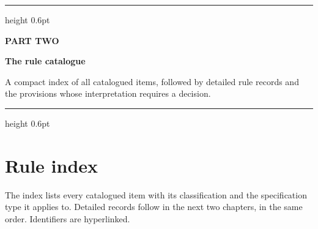 \documentclass[11pt,a4paper]{report}
\begin{document}
\clearpage
\thispagestyle{empty}
\vspace*{60mm}
{\color{rulegrey}\hrule height 0.6pt}
\vspace{6mm}
{\sffamily\footnotesize\bfseries\color{steel}\MakeUppercase{Part Two}\par}
\vspace{2mm}
{\sffamily\bfseries\fontsize{22}{26}\selectfont\color{navy}The rule catalogue\par}
\vspace{5mm}
{\sffamily\small\color{slate}A compact index of all catalogued items, followed by detailed rule records and the provisions whose interpretation requires a decision.\par}
\vspace{6mm}
{\color{rulegrey}\hrule height 0.6pt}
\clearpage

\chapter{Rule index}

The index lists every catalogued item with its classification and the
specification type it applies to. Detailed records follow in the next two
chapters, in the same order. Identifiers are hyperlinked.
\end{document}
